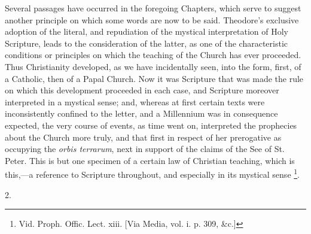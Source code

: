 
Several passages have occurred in the foregoing Chapters, which
serve to suggest another principle on which some words are now to be
said. Theodore's exclusive adoption of the literal, and repudiation of
the mystical interpretation of Holy Scripture, leads to the
consideration of the latter, as one of the characteristic conditions
or principles on which the teaching of the Church has ever proceeded.
Thus Christianity developed, as we have incidentally seen, into the
form, first, of a Catholic, then of a Papal Church. Now it was
Scripture that was made the rule on which this development proceeded
in each case, and Scripture moreover interpreted in a mystical sense;
and, whereas at first certain texts were inconsistently confined to
the letter, and a Millennium was in consequence expected, the very
course of events, as time went on, interpreted the prophecies about
the Church more truly, and that first in respect of her prerogative as
occupying the \emph{orbis terrarum}, next in support of the claims of
the See of St. Peter. This is but one specimen of a certain law of
Christian teaching, which is this,—a reference to Scripture
throughout, and especially in its mystical sense \footnote{Vid. Proph. Offic. Lect. xiii. [Via Media,
vol. i. p. 309, \&c.]}.

2.

